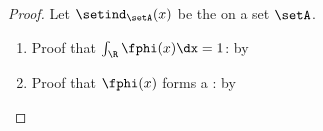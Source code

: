 \begin{proof}
Let $\setind_\setA(x)$ be the   on a set $\setA$.
\begin{enumerate}
  \item Proof that $\int_\R\fphi(x)\dx=1$:  by 

  \item Proof that $\fphi(x)$ forms a : by 


\end{enumerate}
\end{proof}
